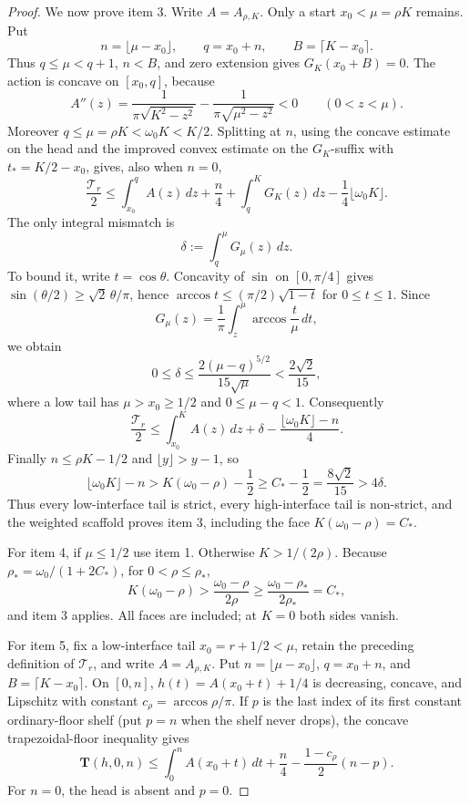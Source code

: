 \documentclass[11pt]{article}
\numberwithin{equation}{section}
\theoremstyle{definition}
\theoremstyle{remark}
\begin{document}
\begin{proof}
We now prove item 3.  Write \(A=A_{\rho,K}\).  Only a start
\(x_0<\mu=\rho K\) remains.  Put
\[
 n=\lfloor\mu-x_0\rfloor,\qquad q=x_0+n,\qquad
 B=\lceil K-x_0\rceil .
\]
Thus \(q\leq\mu<q+1\), \(n<B\), and zero extension gives
\(G_K(x_0+B)=0\).  The action is concave on \([x_0,q]\), because
\[
 A''(z)=\frac1{\pi\sqrt{K^2-z^2}}
 -\frac1{\pi\sqrt{\mu^2-z^2}}<0\qquad(0<z<\mu).
\]
Moreover \(q\leq\mu=\rho K<\omega_0K<K/2\).  Splitting at \(n\), using
the concave estimate on the head and the improved convex estimate on the
\(G_K\)-suffix with \(t_*=K/2-x_0\), gives, also when \(n=0\),
\[
 \frac{\mathcal T_r}{2}
 \leq\int_{x_0}^{q}A(z)\,dz+\frac n4
 +\int_q^KG_K(z)\,dz-\frac14\lfloor\omega_0K\rfloor.
\]
The only integral mismatch is
\[
 \delta:=\int_q^\mu G_\mu(z)\,dz.
\]
To bound it, write \(t=\cos\theta\).  Concavity of \(\sin\) on
\([0,\pi/4]\) gives
\(\sin(\theta/2)\geq\sqrt2\,\theta/\pi\), hence
\(\arccos t\leq(\pi/2)\sqrt{1-t}\) for \(0\leq t\leq1\).  Since
\[
 G_\mu(z)=\frac1\pi\int_z^\mu\arccos\frac t\mu\,dt,
\]
we obtain
\[
 0\leq\delta
 \leq\frac{2(\mu-q)^{5/2}}{15\sqrt\mu}
 <\frac{2\sqrt2}{15},
\]
where a low tail has \(\mu>x_0\geq1/2\) and \(0\leq\mu-q<1\).
Consequently
\[
 \frac{\mathcal T_r}{2}
 \leq\int_{x_0}^{K}A(z)\,dz
 +\delta-\frac{\lfloor\omega_0K\rfloor-n}{4}.
\]
Finally \(n\leq\rho K-1/2\) and \(\lfloor y\rfloor>y-1\), so
\[
 \lfloor\omega_0K\rfloor-n
 >K(\omega_0-\rho)-\frac12
 \geq C_*-\frac12=\frac{8\sqrt2}{15}>4\delta.
\]
Thus every low-interface tail is strict, every high-interface tail is
non-strict, and the weighted scaffold proves item 3, including the face
\(K(\omega_0-\rho)=C_*\).

For item 4, if \(\mu\leq1/2\) use item 1.  Otherwise \(K>1/(2\rho)\).
Because \(\rho_*=\omega_0/(1+2C_*)\), for
\(0<\rho\leq\rho_*\),
\[
 K(\omega_0-\rho)>
 \frac{\omega_0-\rho}{2\rho}
 \geq\frac{\omega_0-\rho_*}{2\rho_*}=C_*,
\]
and item 3 applies.  All faces are included; at \(K=0\) both sides vanish.

For item 5, fix a low-interface tail \(x_0=r+1/2<\mu\), retain the
preceding definition of \(\mathcal T_r\), and write \(A=A_{\rho,K}\).
Put \(n=\lfloor\mu-x_0\rfloor\), \(q=x_0+n\), and
\(B=\lceil K-x_0\rceil\).  On \([0,n]\),
\(h(t)=A(x_0+t)+1/4\) is decreasing, concave, and Lipschitz with
constant \(c_\rho=\arccos\rho/\pi\).  If \(p\) is the last index of its
first constant ordinary-floor shelf (put \(p=n\) when the shelf never
drops), the concave trapezoidal-floor inequality gives
\begin{equation}
 \mathbf T(h,0,n)
 \leq\int_0^nA(x_0+t)\,dt+\frac n4
 -\frac{1-c_\rho}{2}(n-p).
 \label{cm:eq-fixed-head}
\end{equation}
For \(n=0\), the head is absent and \(p=0\).


\end{proof}
\end{document}

